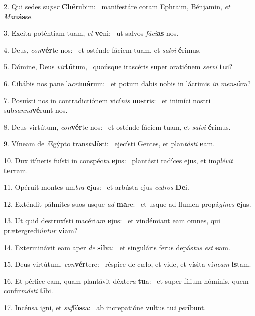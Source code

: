 2. Qui sedes su\textit{per} \textbf{Ché}rubim: \ast\  manifestáre coram Ephraim, Bénjamin, \textit{et} \textit{Ma}\textbf{nás}se.\

3. Excita poténtiam tuam, \textit{et} \textbf{ve}ni: \ast\  ut salvos \textit{fá}\textit{ci}\textbf{as} nos.\

4. Deus, \textit{con}\textbf{vér}te nos: \ast\  et osténde fáciem tuam, et \textit{sal}\textit{vi} \textbf{é}rimus.\

5. Dómine, Deus \textit{vir}\textbf{tú}tum, \ast\  quoúsque irascéris super oratiónem \textit{ser}\textit{vi} \textbf{tu}i?\

6. Cibábis nos pane la\textit{cri}\textbf{má}rum: \ast\  et potum dabis nobis in lácrimis \textit{in} \textit{men}\textbf{sú}ra?\

7. Posuísti nos in contradictiónem vicí\textit{nis} \textbf{nos}tris: \ast\  et inimíci nostri sub\textit{san}\textit{na}\textbf{vé}runt nos.\

8. Deus virtútum, \textit{con}\textbf{vér}te nos: \ast\  et osténde fáciem tuam, et \textit{sal}\textit{vi} \textbf{é}rimus.\

9. Víneam de Ægýpto trans\textit{tu}\textbf{lís}ti: \ast\  ejecísti Gentes, et plan\textit{tás}\textit{ti} \textbf{e}am.\

10. Dux itíneris fuísti in conspéc\textit{tu} \textbf{e}jus: \ast\  plantásti radíces ejus, et im\textit{plé}\textit{vit} \textbf{ter}ram.\

11. Opéruit montes um\textit{bra} \textbf{e}jus: \ast\  et arbústa ejus \textit{ce}\textit{dros} \textbf{De}i.\

12. Exténdit pálmites suos usque \textit{ad} \textbf{ma}re: \ast\  et usque ad flumen propá\textit{gi}\textit{nes} \textbf{e}jus.\

13. Ut quid destruxísti macéri\textit{am} \textbf{e}jus: \ast\  et vindémiant eam omnes, qui prætergredi\textit{ún}\textit{tur} \textbf{vi}am?\

14. Exterminávit eam aper \textit{de} \textbf{sil}va: \ast\  et singuláris ferus depás\textit{tus} \textit{est} \textbf{e}am.\

15. Deus virtútum, \textit{con}\textbf{vér}tere: \ast\  réspice de cælo, et vide, et vísita ví\textit{ne}\textit{am} \textbf{is}tam.\

16. Et pérfice eam, quam plantávit déxte\textit{ra} \textbf{tu}a: \ast\  et super fílium hóminis, quem confir\textit{más}\textit{ti} \textbf{ti}bi.\

17. Incénsa igni, et \textit{suf}\textbf{fós}sa: \ast\  ab increpatióne vultus tu\textit{i} \textit{per}\textbf{í}bunt.\

